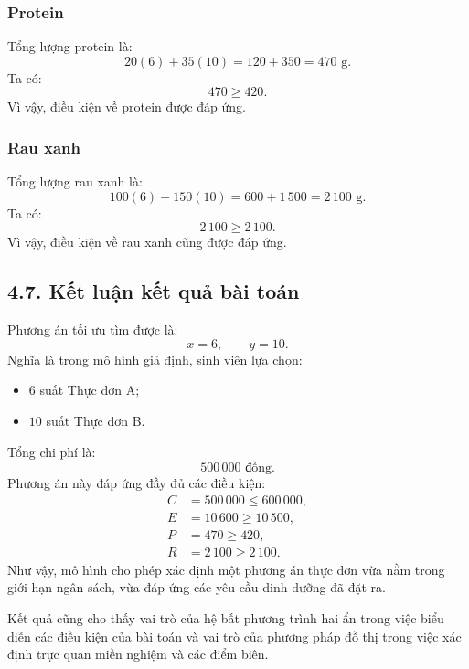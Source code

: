 \documentclass[12pt,a4paper]{article}
\begin{document}
\subsubsection*{Protein}
Tổng lượng protein là:
\[
20(6)+35(10)
=120+350
=470\text{ g}.
\]
Ta có:
\[
470\geq420.
\]
Vì vậy, điều kiện về protein được đáp ứng.
\subsubsection*{Rau xanh}
Tổng lượng rau xanh là:
\[
100(6)+150(10)
=600+1\,500
=2\,100\text{ g}.
\]
Ta có:
\[
2\,100\geq2\,100.
\]
Vì vậy, điều kiện về rau xanh cũng được đáp ứng.


\subsection*{4.7. Kết luận kết quả bài toán}

Phương án tối ưu tìm được là:
\[
\boxed{
x=6,\qquad y=10.
}
\]
Nghĩa là trong mô hình giả định, sinh viên lựa chọn:
\begin{itemize}
    \item $6$ suất Thực đơn A;
    \item $10$ suất Thực đơn B.
\end{itemize}
Tổng chi phí là:
\[
\boxed{
500\,000\text{ đồng}.
}
\]
Phương án này đáp ứng đầy đủ các điều kiện:
\[
\boxed{
\begin{aligned}
C&=500\,000\leq600\,000,\\
E&=10\,600\geq10\,500,\\
P&=470\geq420,\\
R&=2\,100\geq2\,100.
\end{aligned}}
\]
Như vậy, mô hình cho phép xác định một phương án thực đơn vừa nằm trong giới hạn ngân sách, vừa đáp ứng các yêu cầu dinh dưỡng đã đặt ra.

Kết quả cũng cho thấy vai trò của hệ bất phương trình hai ẩn trong việc biểu diễn các điều kiện của bài toán và vai trò của phương pháp đồ thị trong việc xác định trực quan miền nghiệm và các điểm biên.

\end{document}
